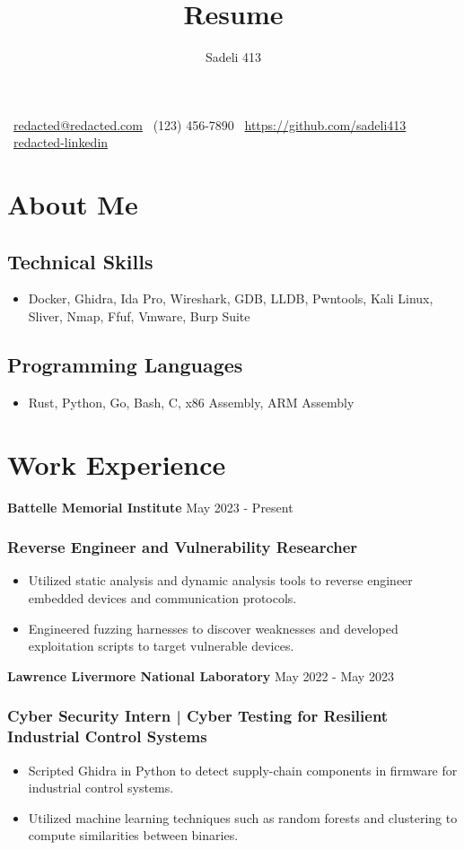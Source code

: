 \documentclass{article}
\makeatletter
\renewcommand{\maketitle}{
  \begin{center}
  {\Large \theauthor}
  {\vspace{0.1in}}

  \faEnvelopeO \ \href{mailto:redacted@redacted.com}{redacted@redacted.com} \hspace{.2in} \faMobile \ (123) 456-7890 \hspace{.2in} \faGithubSquare \ \url{https://github.com/sadeli413} \hspace{.2in} \faLinkedinSquare \ \href{https://www.linkedin.com}{redacted-linkedin} \hspace{.2in}
  \end{center} 
}
\newcommand{\resumesubsection}[2]{
  \noindent \textbf{#1} \hfill #2
}
\makeatother
\begin{document}
\title{Resume}
\author{Sadeli 413}
\maketitle

\section{About Me}

\subsection{Technical Skills}
\begin{itemize}
  \item Docker, Ghidra, Ida Pro, Wireshark, GDB, LLDB, Pwntools, Kali Linux, Sliver, Nmap, Ffuf, Vmware, Burp Suite
\end{itemize}
\subsection{Programming Languages}
\begin{itemize}
  \item Rust, Python, Go, Bash, C, x86 Assembly, ARM Assembly
\end{itemize}

\section{Work Experience}

\resumesubsection{Battelle Memorial Institute}{May 2023 - Present}
\subsubsection{Reverse Engineer and Vulnerability Researcher}
\begin{itemize}
  \item Utilized static analysis and dynamic analysis tools to reverse engineer embedded devices and communication protocols.
  \item Engineered fuzzing harnesses to discover weaknesses and developed exploitation scripts to target vulnerable devices.
\end{itemize}

\resumesubsection{Lawrence Livermore National Laboratory}{May 2022 - May 2023}
\subsubsection{Cyber Security Intern | Cyber Testing for Resilient Industrial Control Systems}
\begin{itemize}
  \item Scripted Ghidra in Python to detect supply-chain components in firmware for industrial control systems.
  \item Utilized machine learning techniques such as random forests and clustering to compute similarities between binaries.
\end{itemize}
\end{document}
